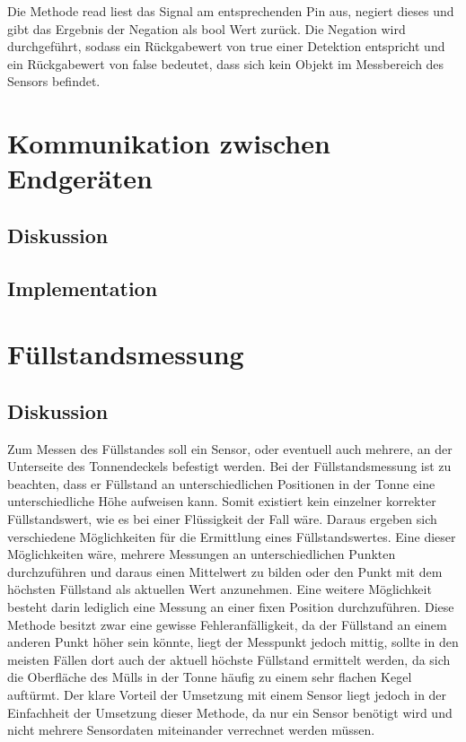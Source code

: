         Die Methode read liest das Signal am entsprechenden Pin aus, negiert dieses und gibt das Ergebnis der Negation als bool Wert zurück. Die Negation wird durchgeführt, sodass ein Rückgabewert von true einer Detektion entspricht und ein Rückgabewert von false bedeutet, dass sich kein Objekt im Messbereich des Sensors befindet.

\section{Kommunikation zwischen Endgeräten}
    \subsection{Diskussion}

    \subsection{Implementation}

\section{Füllstandsmessung}
    \subsection{Diskussion}
        Zum Messen des Füllstandes soll ein Sensor, oder eventuell auch mehrere, an der Unterseite des Tonnendeckels befestigt werden. Bei der Füllstandsmessung ist zu beachten, dass er Füllstand an unterschiedlichen Positionen in der Tonne eine unterschiedliche Höhe aufweisen kann. Somit existiert kein einzelner korrekter Füllstandswert, wie es bei einer Flüssigkeit der Fall wäre. Daraus ergeben sich verschiedene Möglichkeiten für die Ermittlung eines Füllstandswertes. Eine dieser Möglichkeiten wäre, mehrere Messungen an unterschiedlichen Punkten durchzuführen und daraus einen Mittelwert zu bilden oder den Punkt mit dem höchsten Füllstand als aktuellen Wert anzunehmen. Eine weitere Möglichkeit besteht darin lediglich eine Messung an einer fixen Position durchzuführen. Diese Methode besitzt zwar eine gewisse Fehleranfälligkeit, da der Füllstand an einem anderen Punkt höher sein könnte, liegt der Messpunkt jedoch mittig, sollte in den meisten Fällen dort auch der aktuell höchste Füllstand ermittelt werden, da sich die Oberfläche des Mülls in der Tonne häufig zu einem sehr flachen Kegel auftürmt. Der klare Vorteil der Umsetzung mit einem Sensor liegt jedoch in der Einfachheit der Umsetzung dieser Methode, da nur ein Sensor benötigt wird und nicht mehrere Sensordaten miteinander verrechnet werden müssen.\\
        
